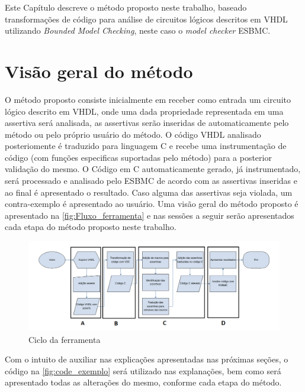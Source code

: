 \label{chapter:metodo}
\par
Este Capítulo descreve o método proposto neste trabalho, baseado transformações de código para análise de circuitos lógicos descritos em VHDL utilizando 
\textit{Bounded Model Checking}, neste caso o \textit{model checker} ESBMC.

\section{Visão geral do método}

\par
O método proposto consiste inicialmente em receber como entrada um circuito lógico descrito em VHDL, onde uma dada propriedade representada em uma assertiva será analisada, as assertivas serão inseridas de automaticamente pelo método ou pelo próprio usuário do método. O código VHDL analisado posteriomente é traduzido para linguagem C e recebe uma instrumentação de código (com funções especificas suportadas pelo método) para a posterior validação do mesmo. O Código em C automaticamente gerado, já instrumentado, será processado e analisado pelo ESBMC de acordo com as assertivas inseridas e ao final é apresentado o resultado. Caso alguma das assertivas seja violada, um contra-exemplo é apresentado ao usuário. Uma visão geral do método proposto é apresentado na \autoref{fig:Fluxo_ferramenta} e nas sessões a seguir serão apresentados cada etapa do método proposto neste trabalho.

\begin{figure}[H]
	\begin{center}
    \caption{\label{fig:Fluxo_ferramenta}Ciclo da ferramenta}
	\includegraphics[scale=0.55]{Figuras/Fluxo_ferramenta.png}
	\end{center}
\end{figure}

\par
Com o intuito de auxiliar nas explicações apresentadas nas próximas seções, o código na \autoref{fig:code_exemplo} será utilizado nas explanações, bem como será apresentado todas as alterações do mesmo, conforme cada etapa do método.  

